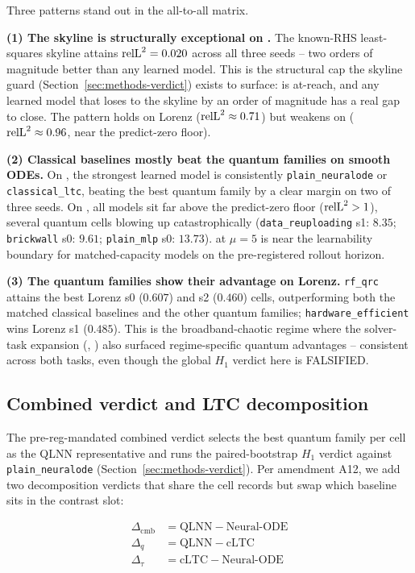 Three patterns stand out in the all-to-all matrix.

\textbf{(1) The skyline is structurally exceptional on \lv{}.}
The known-RHS least-squares skyline attains $\mathrm{relL}^2 = 0.020$
across all three \lv{} seeds -- two orders of magnitude better
than any learned model. This is the structural cap the skyline
guard (Section~\ref{sec:methods-verdict}) exists to surface:
\lv{} is at-reach, and any learned model that loses to the skyline
by an order of magnitude has a real gap to close. The pattern
holds on Lorenz ($\mathrm{relL}^2 \approx 0.71$) but weakens on \vdp{}
($\mathrm{relL}^2 \approx 0.96$, near the predict-zero floor).

\textbf{(2) Classical baselines mostly beat the
quantum families on smooth ODEs.}
On \lv{}, the strongest learned model is consistently
\texttt{plain\_neuralode} or \texttt{classical\_ltc}, beating the
best quantum family by a clear margin on two of three seeds. On
\vdp{}, all models sit far above the predict-zero floor
($\mathrm{relL}^2 > 1$), several quantum cells blowing up catastrophically
(\texttt{data\_reuploading} s1: $8.35$; \texttt{brickwall} s0:
$9.61$; \texttt{plain\_mlp} s0: $13.73$). \vdp{} at $\mu=5$
is near the learnability boundary for matched-capacity models on
the pre-registered rollout horizon.

\textbf{(3) The quantum families show their advantage on Lorenz.}
\texttt{rf\_qrc} attains the best Lorenz s0 ($0.607$) and s2
($0.460$) cells, outperforming both the matched classical
baselines and the other quantum families;
\texttt{hardware\_efficient} wins Lorenz s1 ($0.485$). This is the
broadband-chaotic regime where the solver-task expansion (\fhn{},
\ac{}) also surfaced regime-specific quantum advantages --
consistent across both tasks, even though the global $H_1$ verdict
here is FALSIFIED.

\subsection{Combined verdict and LTC decomposition}
\label{sec:forecaster-decomp}

The pre-reg-mandated combined verdict selects the best quantum
family per cell as the QLNN representative and runs the
paired-bootstrap $H_1$ verdict against \texttt{plain\_neuralode}
(Section~\ref{sec:methods-verdict}). Per amendment A12, we add two
decomposition verdicts that share the cell records but swap which
baseline sits in the contrast slot:

\begin{align*}
\Delta_\mathrm{cmb} &= \mathrm{QLNN} - \text{Neural-ODE} \\
\Delta_q  &= \mathrm{QLNN} - \text{cLTC} \\
\Delta_\tau   &= \text{cLTC} - \text{Neural-ODE}
\end{align*}

